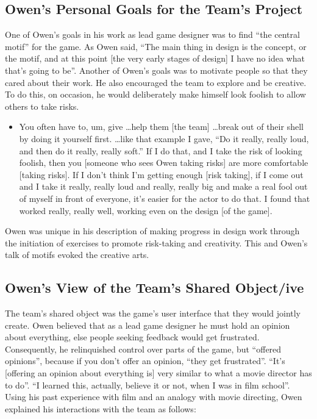 \documentclass{chi2009}
\begin{document}
\subsection{Owen's Personal Goals for the Team's Project} One of Owen's goals in his work as lead game designer was to find ``the central motif'' for the game. As Owen said, ``The main thing in design is the concept, or the motif, and at this point [the very early stages of design] I have no idea what that's going to be''. Another of Owen's goals was to motivate people so that they cared about their work.  He also encouraged the team to explore and be creative. To do this, on occasion, he would deliberately make himself look foolish to allow others to take risks. 
\begin{itemize}
\item[] You often have to, um, give \dots help them [the team] \ldots break out of their shell by doing it yourself first. \ldots like that example I gave, ``Do it really, really loud, and then do it really, really soft.'' If I do that, and I take the risk of looking foolish, then you [someone who sees Owen taking risks] are more comfortable [taking risks]. If I don't think I'm getting enough [risk taking], if I come out and I take it really, really loud and really, really big and make a real fool out of myself in front of everyone, it's easier for the actor to do that. I found that worked really, really well, working even on the design [of the game].
\end{itemize}

Owen was unique in his description of making progress in design work through the initiation of exercises to promote risk-taking and creativity.  This and Owen's talk of motifs evoked the creative arts.   

\subsection{Owen's View of the Team's Shared Object/ive} 
The team's shared object was the game's user interface that they would jointly create. Owen believed that as a lead game designer he must hold an opinion about everything, else people seeking feedback would get frustrated. Consequently, he relinquished control over parts of the game, but ``offered opinions'', because if you don't offer an opinion, ``they get frustrated''. ``It's [offering an opinion about everything is] very similar to what a movie director has to do''. ``I learned this, actually, believe it or not, when I was in film school''. Using his past experience with film and an analogy with movie directing, Owen explained his interactions with the team as follows:
\end{document}
